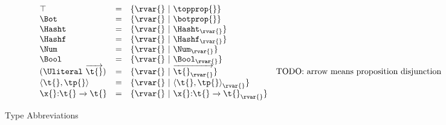 \begin{figure*}
$$
\begin{array}{lclr}
  \top &=& {\refinenotype {\rvar{}} {\topprop{}}}\\
  \Bot &=& {\refinenotype {\rvar{}} {\botprop{}}}\\
  \Hasht &=& {\refinenotype {\rvar{}} {\isprop {\Hasht} {\rvar{}}}}\\
  \Hashf &=& {\refinenotype {\rvar{}} {\isprop {\Hashf} {\rvar{}}}}\\
  \Num &=& {\refinenotype {\rvar{}} {\isprop {\Num} {\rvar{}}}}\\
  \Bool &=& {\refinenotype {\rvar{}} {\isprop {\Bool} {\rvar{}}}}\\
  {\Unionsplice {\overrightarrow{\t{}}}}
    &=& {\refinenotype {\rvar{}} {\overrightarrow{\isprop {\t{}} {\rvar{}}}}}
      & \text{TODO: arrow means proposition disjunction}\\
  {\Cons {\t{}} {\tp{}}}
    &=& {\refinenotype {\rvar{}} {\isprop{\Cons {\t{}} {\tp{}}} {\rvar{}}}}
  \\
                      {\ArrowJustType {\x{}} {\t{}} {\t{}}}
    &=& {\refinenotype {\rvar{}} {\isprop {\ArrowJustType {\x{}} {\t{}} {\t{}}}{\rvar{}}}}
\end{array}
$$
\caption{Type Abbreviations}
\end{figure*}
